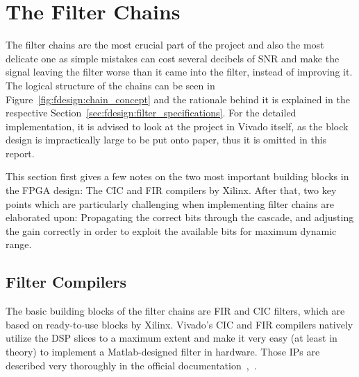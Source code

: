 \section{The Filter Chains} %
\label{sec:fpga:chains}
%
%
The filter chains are  the most crucial part of the project  and also the most
delicate  one  as  simple  mistakes  can cost  several  decibels  of  SNR  and
make  the signal  leaving  the filter  worse  than it  came  into the  filter,
instead  of improving  it.  The  logical structure  of the  chains can  be seen
in  Figure~\ref{fig:fdesign:chain_concept}  and  the rationale  behind  it  is
explained  in the  respective Section~\ref{sec:fdesign:filter_specifications}.
For the  detailed implementation,  it is  advised to look  at the  project in
Vivado  itself, as  the block  design is  impractically large  to be  put onto
paper, thus it is omitted in this report.

This section first gives a few notes on the two most important building blocks
in the FPGA design: The CIC and FIR  compilers by Xilinx.  After that, two key
points which are particularly challenging  when implementing filter chains are
elaborated  upon: Propagating  the  correct  bits  through  the  cascade,  and
adjusting  the gain  correctly  in order  to exploit  the  available bits  for
maximum dynamic range.

%
%
\subsection{Filter Compilers} %
\label{subsec:fpga:filter_compilers}

The  basic building  blocks of  the  filter chains  are FIR  and CIC  filters,
which  are  based on  ready-to-use  blocks  by  Xilinx. Vivado's CIC  and  FIR
compilers natively  utilize the  DSP slices  to a maximum  extent and  make it
very  easy  (at  least  in  theory)  to  implement  a  Matlab-designed  filter
in  hardware. Those  IPs  are  described   very  thoroughly  in  the  official
documentation~\cite{xilinx:fir-compiler},~\cite{xilinx:cic-compiler}.

